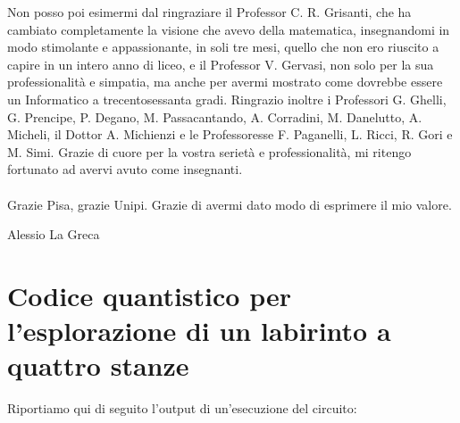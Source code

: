 \documentclass{book}
\theoremstyle{definition}
\theoremstyle{definition}
\theoremstyle{definition}
\theoremstyle{plain}
\theoremstyle{plain}
\theoremstyle{plain}
\theoremstyle{plain}
\begin{document}
\indent Non posso poi esimermi dal ringraziare il Professor C. R. Grisanti, che ha cambiato completamente la visione che avevo della matematica, insegnandomi in modo stimolante e appassionante, in soli tre mesi, quello che non ero riuscito a capire in un intero anno di liceo, e il Professor V. Gervasi, non solo per la sua professionalità e simpatia, ma anche per avermi mostrato come dovrebbe essere un Informatico a trecentosessanta gradi. Ringrazio inoltre i Professori G. Ghelli, G. Prencipe, P. Degano, M. Passacantando, A. Corradini, M. Danelutto, A. Micheli, il Dottor A. Michienzi e le Professoresse F. Paganelli, L. Ricci, R. Gori e M. Simi. Grazie di cuore per la vostra serietà e professionalità, mi ritengo fortunato ad avervi avuto come insegnanti.\\\\
Grazie Pisa, grazie Unipi. Grazie di avermi dato modo di esprimere il mio valore.\\
\begin{flushright}
Alessio La Greca
\end{flushright}

\newpage

\appendix
\chapter{Codice quantistico per l'esplorazione di un labirinto a quattro stanze}



\noindent Riportiamo qui di seguito l'output di un'esecuzione del circuito:\\
\end{document}
